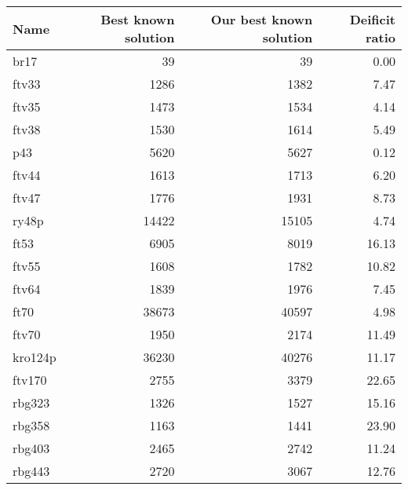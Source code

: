 \begin{table}
\centering
\begin{tabular}{l|r|r|r}
\hline
Name & Best known solution & Our best known solution & Deificit ratio\\
\hline
br17 & 39 & 39 & 0.00\\
\hline
ftv33 & 1286 & 1382 & 7.47\\
\hline
ftv35 & 1473 & 1534 & 4.14\\
\hline
ftv38 & 1530 & 1614 & 5.49\\
\hline
p43 & 5620 & 5627 & 0.12\\
\hline
ftv44 & 1613 & 1713 & 6.20\\
\hline
ftv47 & 1776 & 1931 & 8.73\\
\hline
ry48p & 14422 & 15105 & 4.74\\
\hline
ft53 & 6905 & 8019 & 16.13\\
\hline
ftv55 & 1608 & 1782 & 10.82\\
\hline
ftv64 & 1839 & 1976 & 7.45\\
\hline
ft70 & 38673 & 40597 & 4.98\\
\hline
ftv70 & 1950 & 2174 & 11.49\\
\hline
kro124p & 36230 & 40276 & 11.17\\
\hline
ftv170 & 2755 & 3379 & 22.65\\
\hline
rbg323 & 1326 & 1527 & 15.16\\
\hline
rbg358 & 1163 & 1441 & 23.90\\
\hline
rbg403 & 2465 & 2742 & 11.24\\
\hline
rbg443 & 2720 & 3067 & 12.76\\
\hline
\end{tabular}
\end{table}
